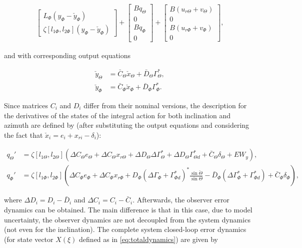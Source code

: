 \documentclass[../main.tex]{subfiles}
\begin{document}
\begin{align}
\begin{bmatrix}
L_{\Phi}(y_{\Phi} - \check{y}_{\Phi}) \\
\zeta[l_{1\Phi},l_{2{\Phi}}](y_\Phi - \check{y}_\Phi)
\end{bmatrix} +
\begin{bmatrix}
Bq_\Theta \\
0 \\
Bq_\Phi \\
0	
\end{bmatrix} +
\begin{bmatrix}
B(u_{r\Theta} + v_\Theta)\\
0 \\
B(u_{r\Phi} + v_\Phi) \\
0
\end{bmatrix},
\end{align}

and with corresponding output equations

\begin{align}
	\check{y}_\Theta &= \bar{C}_\Theta \check{x}_\Theta + \bar{D}_\Theta \Gamma_\Theta^*, \\
	\check{y}_\Phi &= \bar{C}_\Phi \check{x}_\Phi + \bar{D}_\Phi \Gamma_\Phi^*.		
\end{align}
	
Since matrices $C_i$ and $D_i$ differ from their nominal versions, the description for the derivatives of the states of the integral action for both inclination and azimuth are defined by (after substituting the output equations and considering the fact that $\check{x}_i = e_i + x_{ri} - \delta_i$):

\begin{align}
	q_\Theta' &= \zeta[l_{1\Theta},l_{2\Theta}](\Delta C_\Theta e_\Theta + \Delta C_\Theta x_{r\Theta} + \Delta D_\Theta \Delta \Gamma_\Theta^*  + \Delta D_\Theta \Gamma_{\Theta d}^* + \bar{C}_\Theta \delta_\Theta + EW_y), \\
	q_\Phi' &= \zeta[l_{1\Phi},l_{2\Phi}](\Delta C_\Phi e_\Phi + \Delta C_\Phi x_{r\Phi} + D_\Phi (\Delta \Gamma_{\Phi} + \Gamma_{\Phi d}^*)^*\frac{\sin \check{\Theta}}{\sin \Theta} - \bar{D}_\Phi (\Delta \Gamma_\Phi^* + \Gamma_{\Phi d}^*)  + \bar{C}_\Phi \delta_\Phi),
\end{align}

where $\Delta D_i = D_i-\bar{D}_i$ and $\Delta C_i = C_i - \bar{C}_i$. Afterwards, the observer error dynamics can be obtained. The main difference is that in this case, due to model uncertainty, the observer dynamics are not decoupled from the system dynamics (not even for the inclination). The complete system closed-loop error dynamics (for state vector $X(\xi)$ defined as in \eqref{eq:totaldynamics}) are given by
\end{document}
